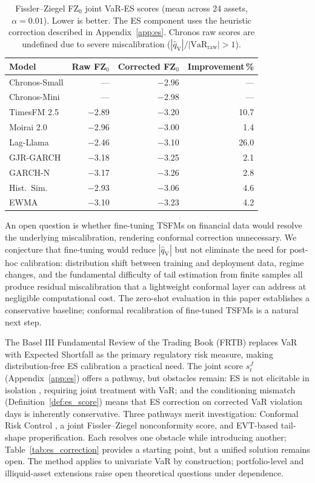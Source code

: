 \documentclass[preprint,11pt,authoryear]{elsarticle}
\newcommand{\1}{\boldsymbol{1}}
\newcommand{\qV}{\hat{q}_{\scriptscriptstyle\mathrm{V}}}
\begin{document}
	\begin{table}[H]
		\centering
		\caption{Fissler--Ziegel FZ$_0$ joint VaR-ES scores (mean across 24 assets, $\alpha = 0.01$). Lower is better. The ES component uses the heuristic correction described in Appendix~\ref{app:es}. Chronos raw scores are undefined due to severe miscalibration ($|\qV|/|\mathrm{VaR}_{\mathrm{raw}}| > 1$).}
		\label{tab:fz_scores}
		\footnotesize
		\begin{tabular}{@{}lrrr@{}}
			\toprule
			Model & Raw FZ$_0$ & Corrected FZ$_0$ & Improvement\,\% \\
			\midrule
			Chronos-Small      & ---   & $-$2.96 & ---  \\
			Chronos-Mini       & ---   & $-$2.98 & ---  \\
			TimesFM 2.5        & $-$2.89 & $-$3.20 & 10.7 \\
			Moirai 2.0         & $-$2.96 & $-$3.00 &  1.4 \\
			Lag-Llama          & $-$2.46 & $-$3.10 & 26.0 \\
			GJR-GARCH          & $-$3.18 & $-$3.25 &  2.1 \\
			GARCH-N            & $-$3.17 & $-$3.26 &  2.8 \\
			Hist.\ Sim.        & $-$2.93 & $-$3.06 &  4.6 \\
			EWMA               & $-$3.10 & $-$3.23 &  4.2 \\
			\bottomrule
		\end{tabular}
	\end{table}

	An open question is whether fine-tuning TSFMs on financial
	data would resolve the underlying miscalibration, rendering
	conformal correction unnecessary. We conjecture that
	fine-tuning would reduce $|\qV|$ but not eliminate the need
	for post-hoc calibration: distribution shift between training
	and deployment data, regime changes, and the fundamental
	difficulty of tail estimation from finite samples all produce
	residual miscalibration that a lightweight conformal layer can
	address at negligible computational cost. The zero-shot
	evaluation in this paper establishes a conservative baseline;
	conformal recalibration of fine-tuned TSFMs is a natural next
	step.
	
	The Basel III Fundamental Review of the Trading Book (FRTB) replaces VaR with Expected Shortfall as the primary regulatory risk measure, making distribution-free ES calibration a practical need. The joint score $s^J_t$ (Appendix~\ref{app:es}) offers a pathway, but obstacles remain: ES is not elicitable in isolation \citep{gneiting2011making}, requiring joint treatment with VaR; and the conditioning mismatch (Definition~\ref{def:es_score}) means that ES correction on corrected VaR violation days is inherently conservative. Three pathways merit investigation: Conformal Risk Control \citep{angelopoulos2024conformal}, a joint Fissler--Ziegel nonconformity score, and EVT-based tail-shape properification. Each resolves one obstacle while introducing another; Table~\ref{tab:es_correction} provides a starting point, but a unified solution remains open. The method applies to univariate VaR by construction; portfolio-level and illiquid-asset extensions raise open theoretical questions under dependence.
	
\end{document}
